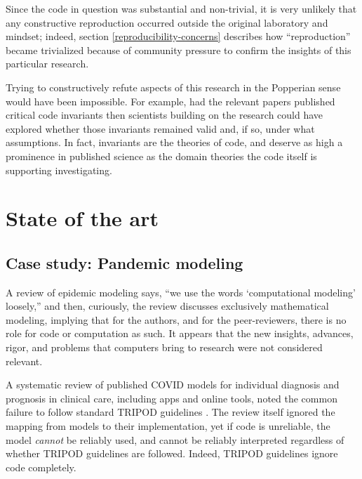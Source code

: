 \documentclass{comjnl}
\begin{document}
Since the code in question was substantial and non-trivial, it is very unlikely that any constructive reproduction occurred outside the original laboratory and mindset; indeed, section \ref{reproducibility-concerns} describes how ``reproduction'' became trivialized because of community pressure to confirm the insights of this particular research. 

Trying to constructively refute aspects of this research in the Popperian sense \cite{popper-conjectures-refutations} would have been impossible. For example, had the relevant papers published critical code invariants then scientists building on the research could have explored whether those invariants remained valid and, if so, under what assumptions. In fact, invariants are the theories of code, and deserve as high a prominence in published  science as the domain theories the code itself is supporting investigating. 


\section{State of the art}%

\subsection{Case study: Pandemic modeling}
\label{section-pandemic-modeling}
A review of epidemic modeling \cite{science-review} says, ``we use the words `computational modeling' loosely,'' and then, curiously, the review discusses exclusively mathematical modeling, implying that for the authors, and for the peer-reviewers, there is no role for code or computation as such. It appears that the new insights, advances, rigor, and problems that computers bring to research were not considered relevant. 

A systematic review \cite{diagnosis-reviews} of published COVID models for individual diagnosis and prognosis in clinical care, including apps and online tools, noted the common failure to follow standard TRIPOD guidelines \cite{tripod}. The review \cite{diagnosis-reviews} itself ignored the mapping from models to their implementation, yet if code is unreliable, the model \emph{cannot\/} be reliably used, and cannot be reliably interpreted regardless of whether TRIPOD guidelines are followed. Indeed, TRIPOD guidelines ignore code completely. 
\end{document}
